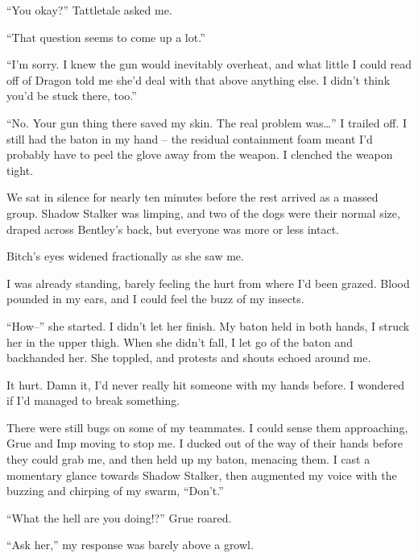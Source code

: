 ``You okay?'' Tattletale asked me.



``That question seems to come up a lot.''



``I'm sorry.  I knew the gun would inevitably overheat, and what little I could read off of Dragon told me she'd deal with that above anything else.  I didn't think you'd be stuck there, too.''



``No.  Your gun thing there saved my skin.  The real problem was\ldots'' I trailed off.  I still had the baton in my hand – the residual containment foam meant I'd probably have to peel the glove away from the weapon.  I clenched the weapon tight.



We sat in silence for nearly ten minutes before the rest arrived as a massed group.  Shadow Stalker was limping, and two of the dogs were their normal size, draped across Bentley's back, but everyone was more or less intact.



Bitch's eyes widened fractionally as she saw me.



I was already standing, barely feeling the hurt from where I'd been grazed.  Blood pounded in my ears, and I could feel the buzz of my insects.



``How--'' she started.  I didn't let her finish.  My baton held in both hands, I struck her in the upper thigh.  When she didn't fall, I let go of the baton and backhanded her.  She toppled, and protests and shouts echoed around me.



It hurt.  Damn it, I'd never really hit someone with my hands before.  I wondered if I'd managed to break something.



There were still bugs on some of my teammates.  I could sense them approaching, Grue and Imp moving to stop me.  I ducked out of the way of their hands before they could grab me, and then held up my baton, menacing them.  I cast a momentary glance towards Shadow Stalker, then augmented my voice with the buzzing and chirping of my swarm, ``Don't.''



``What the hell are you doing!?'' Grue roared.



``Ask her,'' my response was barely above a growl.



